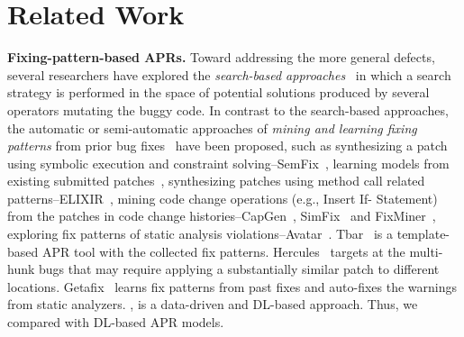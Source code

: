 \section{Related Work}
\label{related:sec}


{\bf Fixing-pattern-based APRs.} 
%
Toward addressing the more general defects, several researchers have
explored the {\em search-based
  approaches}~\cite{le2011genprog,qi2014strength,LeGoues-icse12,martinez2016astor}
in which a search strategy is performed in the space of potential
solutions produced by several operators mutating the buggy code. In
contrast to the search-based approaches, the automatic or
semi-automatic approaches of {\em mining and learning fixing patterns}
from prior bug fixes~\cite{le2016history,
  kim2013automatic,nguyen2013semfix,liu2019avatar,tbar-issta19} have
been proposed, such as synthesizing a patch using symbolic execution
and constraint solving--SemFix~\cite{nguyen2013semfix}, learning
models from existing submitted
patches~\cite{long2016automatic,long2017automatic,le2016history},
synthesizing patches using method call related
patterns--ELIXIR~\cite{saha2017elixir}, mining code change operations
(e.g., Insert If- Statement) from the patches in code change
histories--CapGen~\cite{wen2018context}, SimFix~\cite{Simfix} and
FixMiner~\cite{koyuncu2018fixminer}, exploring fix patterns of static
analysis
violations--Avatar~\cite{liu2019avatar}. Tbar~\cite{tbar-issta19} is a
template-based APR tool with the collected fix patterns.
Hercules~\cite{10.1109/ICSE.2019.00020} targets at the multi-hunk bugs
that may require applying a substantially similar patch to different
locations. Getafix~\cite{bader2019getafix} learns fix patterns from
past fixes and auto-fixes the warnings from static analyzers. {\tool},
is a data-driven and DL-based approach. Thus, we compared {\tool} with
DL-based APR models.





